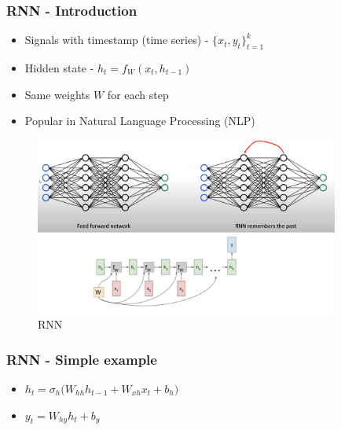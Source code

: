 \documentclass[12pt]{report}
\begin{document}
\subsubsection{RNN - Introduction}
\begin{itemize}
	\item Signals with timestamp (time series) - $\{x_t, y_t \}_{t=1}^k$
	\item Hidden state - $h_t = f_{W}(x_t, h_{t-1})$
	\item Same weights $W$ for each step
	\item Popular in Natural Language Processing (NLP)
\end{itemize}
\begin{figure}[H]\centering\includegraphics[width=10cm]{RNN.png}\caption{RNN}\end{figure}


\subsubsection{RNN - Simple example}

\begin{itemize}
	\item $h_t = \sigma_h \big(W_{hh} h_{t-1} +  W_{xh} x_{t} + b_h\big)$
	\item $y_t  = W_{hy} h_{t} +  b_y$
\end{itemize}
\end{document}
